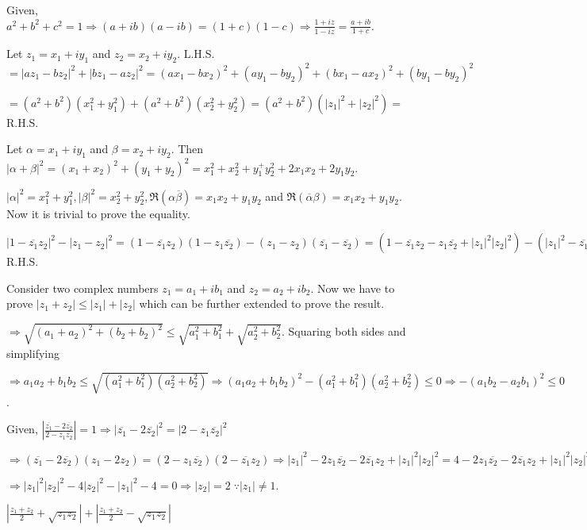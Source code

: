   Given, $a^2 + b^2 + c^2 = 1 \Rightarrow (a + ib)(a - ib) = (1 + c)(1 - c) \Rightarrow \frac{1 + iz}{1 -
    iz} = \frac{a + ib}{1 + c}$.
\item Let $z_1 = x_1 + iy_1$ and $z_2 = x_2 + iy_2$. L.H.S. $= |az_1 - bz_2|^2 + |bz_1 - az_2|^2 = (ax_1 -
  bx_2)^2 + (ay_1 - by_2)^2 + (bx_1 - ax_2)^2 + (by_1 - by_2)^2$

  $= (a^2 + b^2)(x_1^2 + y_1^2) + (a^2 + b^2)(x_2^2 + y_2^2) = (a^2 + b^2)(|z_1|^2 + |z_2|^2) =$ R.H.S.
\item Let $\alpha = x_1 + iy_1$ and $\beta = x_2 + iy_2$. Then $|\alpha + \beta|^2 = (x_1 + x_2)^2 + (y_1 +
  y_2)^2 = x_1^2 + x_2^2 + y_1^ + y_2^2 + 2x_1x_2 + 2y_1y_2$.

  $|\alpha|^2 = x_1^2 + y_1^2, |\beta|^2 = x_2^2 + y_2^2, \Re(\alpha\overline{\beta}) = x_1x_2 + y_1y_2$ and
  $\Re(\overline{\alpha}\beta) = x_1x_2 + y_1y_2$. Now it is trivial to prove the equality.
\item $|1 - \overline{z_1}z_2|^2 - |z_1 - z_2|^2 = (1 - \overline{z_1}z_2)(1 - z_1\overline{z_2}) - (z_1 -
  z_2)(\overline{z_1} - \overline{z_2}) = (1 - \overline{z_1}z_2 - z_1\overline{z_2} + |z_1|^2|z_2|^2) -
  (|z_1|^2 - \overline{z_1}z_2 - z_1\overline{z_2} + |z_2|^2) = 1 - |z_1|^2 - |z_2|^2 + |z_1|^2|z_2|^2 = (1
  - |z_1|^2)(1 - |z_2|^2) =$ R.H.S.
\item Consider two complex numbers $z_1 = a_1 + ib_1$ and $z_2 = a_2 + ib_2.$ Now we have to prove $|z_1 +
  z_2| \le |z_1| + |z_2|$ which can be further extended to prove the result.

  $\Rightarrow \sqrt{(a_1 + a_2)^2 + (b_2 + b_2)^2} \le \sqrt{a_1^2 + b_1^2} + \sqrt{a_2^2 +
    b_2^2}$. Squaring both sides and simplifying

  $\Rightarrow a_1a_2 + b_1b_2 \le \sqrt{(a_1^2 + b_1^2)(a_2^2 + b_2^2)} \Rightarrow (a_1a_2 + b_1b_2)^2 -
  (a_1^2 + b_1^2)(a_2^2 + b_2^2) \le 0\Rightarrow -(a_1b_2 - a_2b_1)^2 \le 0$.
\item Given, $\left|\frac{\overline{z_1} - 2\overline{z_2}}{2 - z_1\overline{z_2}}\right| = 1\Rightarrow
  |\overline{z_1} - 2\overline{z_2}|^2 = |2 - z_1\overline{z_2}|^2$

  $\Rightarrow (\overline{z_1} - 2\overline{z_2})(z_1 - 2z_2) = (2 - z_1\overline{z_2})(2 -
  \overline{z_1}z_2) \Rightarrow |z_1|^2 - 2z_1\overline{z_2} - 2\overline{z_1}z_2 + |z_1|^2|z_2|^2 = 4 -
  2z_1\overline{z_2} - 2\overline{z_1}z_2+ |z_1|^2|z_2|^2$

  $\Rightarrow |z_1|^2|z_2|^2 - 4|z_2|^2 - |z_1|^2 - 4 = 0 \Rightarrow |z_2| = 2\;\because |z_1|\neq 1$.
\item $\left|\frac{z_1 + z_2}{2} + \sqrt{z_1z_2}\right| + \left|\frac{z_1 + z_2}{2} - \sqrt{z_1z_2}\right|$

